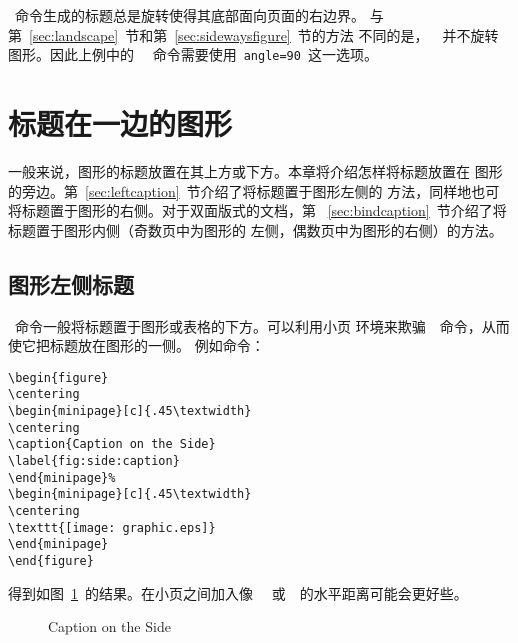 ~命令生成的标题总是旋转使得其底部面向页面的右边界。
与第~\ref{sec:landscape}~节和第~\ref{sec:sidewaysfigure}~节的方法
不同的是，~~并不旋转图形。因此上例中的~~
命令需要使用~\texttt{angle=90}~这一选项。

\section{标题在一边的图形}\label{sec:sidecaption}

一般来说，图形的标题放置在其上方或下方。本章将介绍怎样将标题放置在
图形的旁边。第~\ref{sec:leftcaption}~节介绍了将标题置于图形左侧的
方法，同样地也可将标题置于图形的右侧。对于双面版式的文档，第
~\ref{sec:bindcaption}~节介绍了将标题置于图形内侧（奇数页中为图形的
左侧，偶数页中为图形的右侧）的方法。

\subsection{图形左侧标题}\label{ssec:leftcaption}

~命令一般将标题置于图形或表格的下方。可以利用小页
环境来欺骗~~命令，从而使它把标题放在图形的一侧。
例如命令：
\begin{Verbatim}[xleftmargin=1cm]
\begin{figure} 
\centering 
\begin{minipage}[c]{.45\textwidth} 
\centering 
\caption{Caption on the Side} 
\label{fig:side:caption} 
\end{minipage}%
\begin{minipage}[c]{.45\textwidth} 
\centering 
\texttt{[image: graphic.eps]} 
\end{minipage} 
\end{figure}
\end{Verbatim}
得到如图~\ref{fig:side:caption}~的结果。在小页之间加入像~~
或~~的水平距离可能会更好些。

\begin{figure} 
	\centering 
	\begin{minipage}[c]{.45\textwidth} 
		\centering
		\caption{Caption on the Side} 
		\label{fig:side:caption} 
	\end{minipage}%
	\begin{minipage}[c]{.45\textwidth} 
		\centering 
		\resizebox{\textwidth}{!}{\usebox{\graphic}}
	\end{minipage}  
\end{figure}

